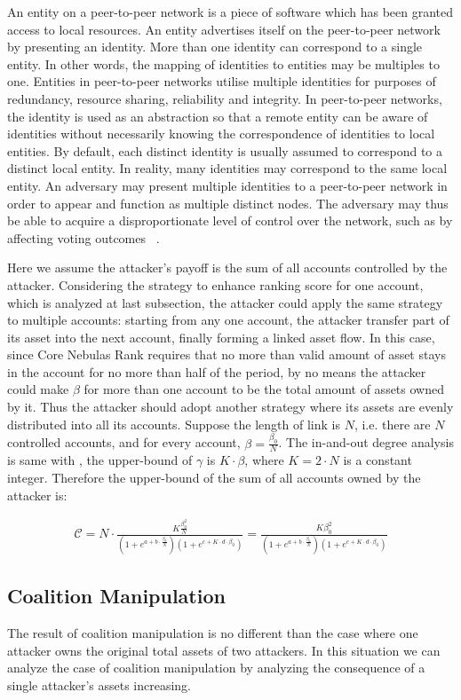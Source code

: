 An entity on a peer-to-peer network is a piece of software which has been granted access to local resources. An entity advertises itself on the peer-to-peer network by presenting an identity. More than one identity can correspond to a single entity. In other words, the mapping of identities to entities may be multiples to one. Entities in peer-to-peer networks utilise multiple identities for purposes of redundancy, resource sharing, reliability and integrity. In peer-to-peer networks, the identity is used as an abstraction so that a remote entity can be aware of identities without necessarily knowing the correspondence of identities to local entities. By default, each distinct identity is usually assumed to correspond to a distinct local entity. In reality, many identities may correspond to the same local entity. An adversary may present multiple identities to a peer-to-peer network in order to appear and function as multiple distinct nodes. The adversary may thus be able to acquire a disproportionate level of control over the network, such as by affecting voting outcomes ~\cite{wiki:sybil}.

Here we assume the attacker's payoff is the sum of all accounts controlled by the attacker. Considering the strategy to enhance ranking score for one account, which is analyzed at last subsection, the attacker could apply the same strategy to multiple accounts: starting from any one account, the attacker transfer part of its asset into the next account, finally forming a linked asset flow. In this case, since Core Nebulas Rank requires that no more than valid amount of asset stays in the account for no more than half of the period, by no means the attacker could make $\beta$ for more than one account to be the total amount of assets owned by it. Thus the attacker should adopt another strategy where its assets are evenly distributed into all its accounts. Suppose the length of link is $N$, i.e. there are $N$ controlled accounts, and for every account, $\beta = \frac{\beta_0}{N}$. The in-and-out degree analysis is same with , the upper-bound of $\gamma$ is $K \cdot \beta$, where $K=2\cdot N$ is a constant integer. Therefore the upper-bound of the sum of all accounts owned by the attacker is:

\begin{align}
\mathcal{C} = N \cdot \frac{K \frac{\beta_0 ^2}{N}}{ (1+e^{a + b \cdot \frac{\beta_0}{N} }) (1+e^{c + K \cdot d \cdot \beta_0})} = \frac{K \beta_0 ^2 }{ (1+e^{a + b \cdot \frac{\beta_0}{N} }) (1+e^{c + K \cdot d \cdot \beta_0})} 
\end{align}


\subsection{Coalition Manipulation \label{sec:coalition}}
The result of coalition manipulation is no different than the case where one attacker owns the original total assets of two attackers. In this situation we can analyze the case of coalition manipulation by analyzing the consequence of a single attacker's assets increasing.



